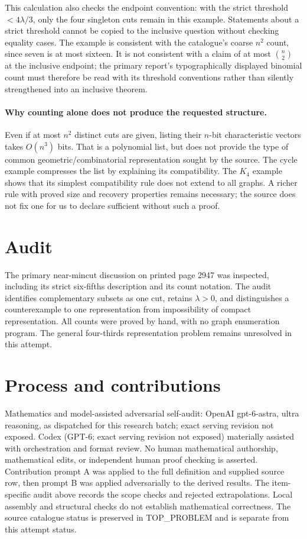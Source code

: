 \documentclass[11pt]{article}
\begin{document}
This calculation also checks the endpoint convention: with the
strict threshold $<4\lambda/3$, only the four singleton cuts
remain in this example. Statements about a strict threshold cannot
be copied to the inclusive question without checking equality cases.
The example is consistent with the catalogue's coarse $n^2$ count,
since seven is at most sixteen. It is not consistent with a
claim of at most $\binom n2$ at the inclusive endpoint;
the primary report's typographically displayed binomial count must
therefore be read with its threshold conventions rather than silently
strengthened into an inclusive theorem.

\paragraph{Why counting alone does not produce the requested structure.}
Even if at most $n^2$ distinct cuts are given, listing their
$n$-bit characteristic vectors takes $O(n^3)$ bits. That is
a polynomial list, but does not provide the type of common
geometric/combinatorial representation sought by the source. The
cycle example compresses the list by explaining its compatibility.
The $K_4$ example shows that its simplest compatibility rule
does not extend to all graphs. A richer rule with proved size
and recovery properties remains necessary; the source does not fix
one for us to declare sufficient without such a proof.

\section{Audit}
The primary near-mincut discussion on printed page 2947 was inspected,
including its strict six-fifths description and its count notation.
The audit identifies complementary subsets as one cut, retains
$\lambda>0$, and distinguishes a counterexample to one representation
from impossibility of compact representation. All counts were proved
by hand, with no graph enumeration program. The general four-thirds
representation problem remains unresolved in this attempt.

\section{Process and contributions}
Mathematics and model-assisted adversarial self-audit: OpenAI gpt-6-astra, ultra reasoning, as dispatched for this research batch; exact serving revision not exposed. Codex (GPT-6; exact serving revision not exposed) materially assisted with orchestration and format review. No human mathematical authorship, mathematical edits, or independent human proof checking is asserted.
Contribution prompt A was applied to the full definition and supplied source row, then prompt B was applied adversarially to the derived results. The item-specific audit above records the scope checks and rejected extrapolations. Local assembly and structural checks do not establish mathematical correctness. The source catalogue status is preserved in TOP\_PROBLEM and is separate from this attempt status.
\end{document}
